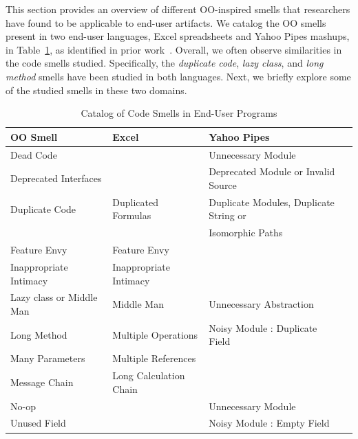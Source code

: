 \documentclass{sig-alternate}
\renewcommand*\cmidrule{\midrule[0.001em]} %
\begin{document}
This section provides an overview of different OO-inspired smells that researchers have found to be applicable to end-user artifacts. 
 We catalog the OO smells present in two end-user languages, Excel spreadsheets and Yahoo Pipes mashups, in Table~\ref{table:oosmellslarge}, as identified in prior work~\cite{Stolee2011,StoleeTSE2013,Hermans2012intra, Hermans2012inter}.
 Overall, we often observe similarities in the code smells studied. Specifically, the \emph{duplicate code}, \emph{lazy class}, and \emph{long method} smells  have been studied in both languages. 
Next, we briefly explore some of the studied smells in these two domains. 



\begin{table}
\caption{Catalog of Code Smells in End-User Programs
\label{table:oosmellslarge}}
\centering
\sffamily
\begin{tabular} {@{}llll@{}}
\toprule
\textbf{OO Smell}
	& \textbf{Excel}
	& \textbf{Yahoo Pipes}
\\ \midrule
Dead Code
	& %
	& Unnecessary Module \cite{StoleeTSE2013}
\\ \cmidrule
Deprecated Interfaces
	& %
	& Deprecated Module or Invalid Source \cite{StoleeTSE2013}

\\ \cmidrule
Duplicate Code
	& Duplicated Formulas \cite{Hermans2012intra}
	& Duplicate Modules, Duplicate String or
\\ %
& 
& Isomorphic Paths \cite{StoleeTSE2013}
\\ \cmidrule
Feature Envy
	& Feature Envy \cite{Hermans2012inter}
	& %
\\ \cmidrule
Inappropriate Intimacy
	& Inappropriate Intimacy \cite{Hermans2012inter}
	& %
\\ \cmidrule
Lazy class or Middle Man
	& Middle Man \cite{Hermans2012inter}
	& Unnecessary Abstraction \cite{StoleeTSE2013}
\\ \cmidrule
Long Method
	& Multiple Operations \cite{Hermans2012intra}
	& Noisy Module : Duplicate Field \cite{StoleeTSE2013}
\\ \cmidrule
Many Parameters
	& Multiple References \cite{Hermans2012intra}
	& 
\\ \cmidrule
Message Chain
	& Long Calculation Chain \cite{Hermans2012intra}
	& 
\\ \cmidrule
No-op
	& %
	& Unnecessary Module \cite{StoleeTSE2013}
\\ \cmidrule
Unused Field
	& %
	& Noisy Module : Empty Field \cite{StoleeTSE2013}
\\ \bottomrule
\end{tabular}
\end{table}
\end{document}
